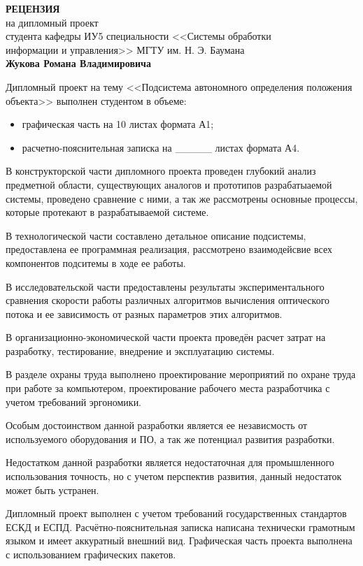 \documentclass
[a4paper,14pt,russian]{article}
\begin{document}
\begin{center}
{\large \textbf{РЕЦЕНЗИЯ}}\\
на дипломный проект \\ 
студента кафедры ИУ5 специальности <<Системы обработки \\
информации и управления>> МГТУ им. Н. Э. Баумана\\
\textbf{Жукова Романа Владимировича}
\end{center}

Дипломный проект на тему <<Подсистема автономного определения положения объекта>>  выполнен студентом в объеме:
\begin{itemize}
\item графическая часть на 10 листах формата А1;
\item расчетно-пояснительная записка на \_\_\_\_\_ листах формата А4.
\end{itemize}

   	В конструкторской части дипломного проекта проведен глубокий анализ предметной области, существующих аналогов и прототипов разрабатыаемой системы, проведено сравнение с ними, а так же рассмотрены основные процессы, которые протекают в разрабатываемой системе. 
   	
   	В технологической части составлено детальное описание подсистемы, предоставлена ее программная реализация, рассмотрено взаимодейсвие всех компонентов подситемы в ходе ее работы. 
   	
   	В исследовательской части предоставлены результаты экспериментального сравнения скорости работы различных алгоритмов вычисления оптического потока и ее зависимость от разных параметров этих алгоритмов. 
   	
   	В организационно-экономической части проекта проведён расчет затрат на разработку, тестирование, внедрение и эксплуатацию системы.
   	
   	В разделе охраны труда выполнено проектирование мероприятий по охране труда при работе за компьютером, проектирование рабочего места разработчика с учетом требований эргономики.
   	
   	Особым достоинством данной разработки является ее независмость от используемого оборудования и ПО, а так же потенциал развития разработки.
   	
    	Недостатком данной разработки является недостаточная для промышленного использования точность, но с учетом перспектив развития, данный недостаток может быть устранен.
    	
Дипломный проект выполнен с учетом требований  государственных стандартов ЕСКД и ЕСПД. Расчётно-пояснительная записка написана технически грамотным языком и имеет аккуратный внешний вид. Графическая часть проекта выполнена с использованием графических пакетов.
\end{document}
